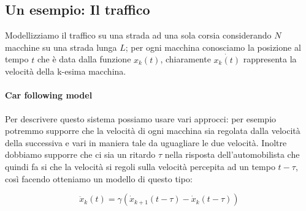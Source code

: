 \subsection{Un esempio: Il traffico}
\begin{center}
\end{center}

Modellizziamo il traffico su una strada ad una sola corsia considerando $N$ macchine su una strada lunga $L$; per ogni macchina conosciamo la posizione al tempo $t$ che è data dalla funzione $x_k(t)$, chiaramente $\dot{x_k(t)}$ rappresenta la velocità della k-esima macchina. \\
\paragraph{Car following model}
Per descrivere questo sistema possiamo usare vari approcci: per esempio potremmo supporre che la velocità di ogni macchina sia regolata dalla velocità della successiva e vari in maniera tale da uguagliare le due velocità.
 Inoltre dobbiamo supporre che ci sia un ritardo $\tau$ nella risposta dell'automobilista che quindi fa si che la velocità si regoli sulla velocità percepita ad un tempo $t-\tau$, così facendo otteniamo un modello di questo tipo:

\begin{equation}
	\ddot{x}_k(t)=\gamma(\dot{x}_{k+1}(t-\tau)-\dot{x}_{k}(t-\tau))
			 \label{diifeqcarfollowing}
\end{equation}

